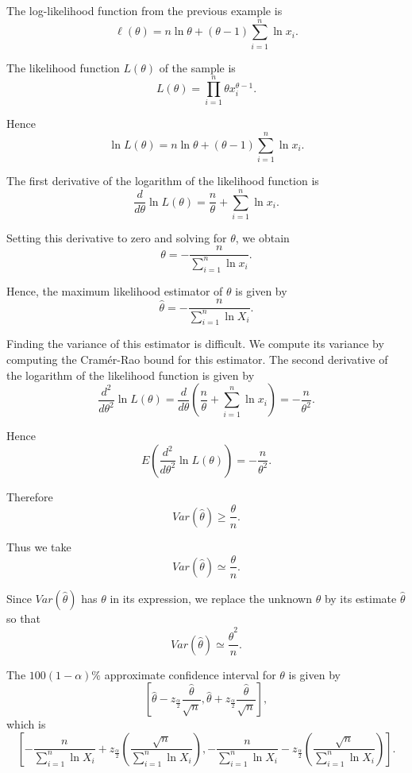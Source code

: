 \begin{solution}
    The log-likelihood function from the previous example is
    \[
    \ell(\theta) = n \ln \theta + (\theta - 1) \sum_{i=1}^n \ln x_i.
    \]

    The likelihood function $L(\theta)$ of the sample is
    \[
        L(\theta) = \prod_{i=1}^n \theta x_i^{\theta - 1}.
    \]

    Hence
    \[
        \ln L(\theta) = n \ln \theta + (\theta - 1) \sum_{i=1}^n \ln x_i.
    \]

    The first derivative of the logarithm of the likelihood function is
    \[
        \frac{d}{d\theta} \ln L(\theta) = \frac{n}{\theta} + \sum_{i=1}^n \ln x_i.
    \]

    Setting this derivative to zero and solving for $\theta$, we obtain
    \[
        \theta = -\frac{n}{\sum_{i=1}^n \ln x_i}.
    \]

    Hence, the maximum likelihood estimator of $\theta$ is given by
    \[
        \widehat{\theta} = -\frac{n}{\sum_{i=1}^n \ln X_i}.
    \]

    Finding the variance of this estimator is difficult. We compute its variance by computing the Cramér-Rao bound for this estimator. The second derivative of the logarithm of the likelihood function is given by
    \[
        \frac{d^2}{d\theta^2} \ln L(\theta) = \frac{d}{d\theta} \left( \frac{n}{\theta} + \sum_{i=1}^n \ln x_i \right) = -\frac{n}{\theta^2}.
    \]

    Hence
    \[
        E\left( \frac{d^2}{d\theta^2} \ln L(\theta) \right) = -\frac{n}{\theta^2}.
    \]

    Therefore
    \[
        Var\left(\widehat{\theta}\right) \geq \frac{\theta}{n}.
    \]

    Thus we take
    \[
        Var\left(\widehat{\theta}\right) \simeq \frac{\theta}{n}.
    \]

    Since $Var\left(\widehat{\theta}\right)$ has $\theta$ in its expression, we replace the unknown $\theta$ by its estimate $\widehat{\theta}$ so that
    \[
        Var\left(\widehat{\theta}\right) \simeq \frac{\widehat{\theta}^2}{n}.
    \]

    The $100(1 - \alpha)\%$ approximate confidence interval for $\theta$ is given by
    \[
        \left[\widehat{\theta} - z_{\frac{\alpha}{2}} \frac{\widehat{\theta}}{\sqrt{n}}, \widehat{\theta} + z_{\frac{\alpha}{2}} \frac{\widehat{\theta}}{\sqrt{n}}\right],
    \]
    which is
    \[
        \left[-\frac{n}{\sum_{i=1}^n \ln X_i} + z_{\frac{\alpha}{2}} \left(\frac{\sqrt{n}}{\sum_{i=1}^n \ln X_i}\right), -\frac{n}{\sum_{i=1}^n \ln X_i} - z_{\frac{\alpha}{2}} \left(\frac{\sqrt{n}}{\sum_{i=1}^n \ln X_i}\right)\right].
    \]


\end{solution}
